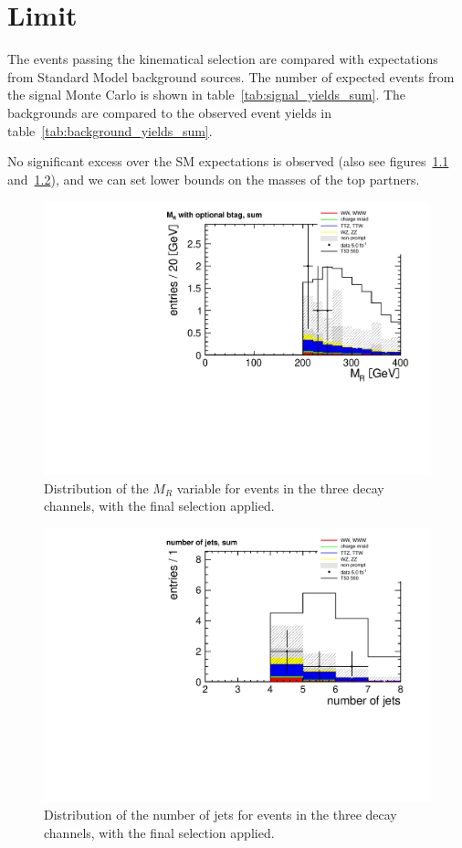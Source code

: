 \chapter{Limit}
The events passing the kinematical selection are compared with expectations
from Standard Model background sources. The number of expected events from
the signal Monte Carlo is shown in table~\ref{tab:signal_yields_sum}. The
backgrounds are compared to the observed event yields in
table~\ref{tab:background_yields_sum}.


No significant excess over the SM expectations is observed (also see
figures~\ref{fig:mr_data} and~\ref{fig:n_jets_data}), and we can set
lower bounds on the masses of the top partners.

\begin{figure}[htb]
    \centering
    \includegraphics[width=.8\textwidth]{images/pdf/4jets_AND_mr200_AND_r02_AND_had_mass350/mr_optional_btag_sum_1}
    \caption{Distribution of the $M_R$ variable for events in the three decay
        channels, with the final
        selection applied.}
    \label{fig:mr_data}
\end{figure}

\begin{figure}[htb]
    \centering
    \includegraphics[width=.8\textwidth]{images/pdf/4jets_AND_mr200_AND_r02_AND_had_mass350/n_jets_sum_1}
    \caption{Distribution of the number of jets for events in the three decay
        channels, with the final
        selection applied.}
    \label{fig:n_jets_data}
\end{figure}


